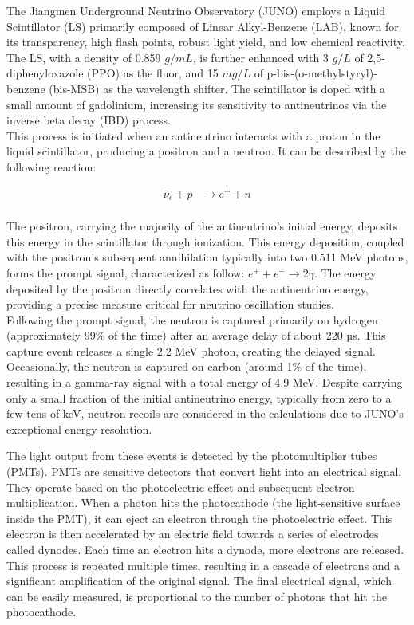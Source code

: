 The Jiangmen Underground Neutrino Observatory (JUNO) employs a Liquid Scintillator (LS) primarily composed of Linear Alkyl-Benzene (LAB), known for its transparency, high flash points, robust light yield, and low chemical reactivity. The LS, with a density of 0.859 $g/mL$, is further enhanced with 3 $g/L$ of 2,5-diphenyloxazole (PPO) as the fluor, and 15 $mg/L$ of p-bis-(o-methylstyryl)-benzene (bis-MSB) as the wavelength shifter. The scintillator is doped with a small amount of gadolinium, increasing its sensitivity to antineutrinos via the inverse beta decay (IBD) process.\\

This process is initiated when an antineutrino interacts with a proton in the liquid scintillator, producing a positron and a neutron. It can be described by the following reaction:

\begin{equation}
	\begin{aligned}
		\overline{\nu}_e + p &\rightarrow e^+ + n \\
	\end{aligned}
\end{equation} 

The positron, carrying the majority of the antineutrino's initial energy, deposits this energy in the scintillator through ionization. This energy deposition, coupled with the positron's subsequent annihilation typically into two 0.511 MeV photons, forms the prompt signal, characterized as follow: $e^{+} + e^{-} \rightarrow 2\gamma$.
The energy deposited by the positron directly correlates with the antineutrino energy, providing a precise measure critical for neutrino oscillation studies.\\

Following the prompt signal, the neutron is captured primarily on hydrogen (approximately 99$\%$ of the time) after an average delay of about 220 µs. This capture event releases a single 2.2 MeV photon, creating the delayed signal. Occasionally, the neutron is captured on carbon (around 1$\%$ of the time), resulting in a gamma-ray signal with a total energy of 4.9 MeV. Despite carrying only a small fraction of the initial antineutrino energy, typically from zero to a few tens of keV, neutron recoils are considered in the calculations due to JUNO's exceptional energy resolution.

The light output from these events is detected by the photomultiplier tubes (PMTs). PMTs are sensitive detectors that convert light into an electrical signal. They operate based on the photoelectric effect and subsequent electron multiplication. When a photon hits the photocathode (the light-sensitive surface inside the PMT), it can eject an electron through the photoelectric effect. This electron is then accelerated by an electric field towards a series of electrodes called dynodes. Each time an electron hits a dynode, more electrons are released. This process is repeated multiple times, resulting in a cascade of electrons and a significant amplification of the original signal. The final electrical signal, which can be easily measured, is proportional to the number of photons that hit the photocathode.


